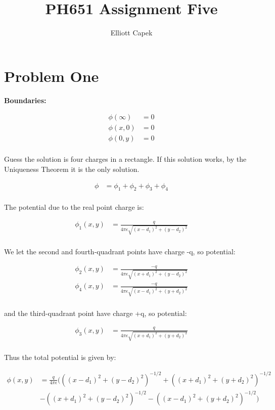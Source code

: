 \documentclass[10pt]{article} %
\title{PH651 Assignment Five}
\author{Elliott Capek}
\begin{document}
\maketitle{}

\section{Problem One}
\textbf{Boundaries:}

\begin{align*}
  \phi(\infty) &= 0\\
  \phi(x,0) &= 0\\
  \phi(0,y) &= 0\\
\end{align*}

Guess the solution is four charges in a rectangle. If this solution works, by the Uniqueness Theorem it is the only solution.

\begin{align*}
  \phi &= \phi_1 + \phi_2 + \phi_3 + \phi_4\\
\end{align*}

The potential due to the real point charge is:

\begin{align*}
  \phi_1(x,y) &= \frac{q}{4\pi\epsilon\sqrt{(x-d_1)^2+(y-d_2)^2}}\\
\end{align*}

We let the second and fourth-quadrant points have charge -q, so potential:

\begin{align*}
  \phi_2(x,y) &= \frac{-q}{4\pi\epsilon\sqrt{(x+d_1)^2+(y-d_2)^2}}\\
  \phi_4(x,y) &= \frac{-q}{4\pi\epsilon\sqrt{(x-d_1)^2+(y+d_2)^2}}\\
\end{align*}

and the third-quadrant point have charge +q, so potential:

\begin{align*}
  \phi_3(x,y) &= \frac{q}{4\pi\epsilon\sqrt{(x+d_1)^2+(y+d_2)^2}}\\
\end{align*}

Thus the total potential is given by:

\begin{align*}
  \phi(x,y) &= \frac{q}{4\pi\epsilon}\Big(
  \left((x-d_1)^2+(y-d_2)^2\right)^{-1/2} + \left((x+d_1)^2+(y+d_2)^2\right)^{-1/2}\\
  &-\left((x+d_1)^2+(y-d_2)^2\right)^{-1/2} - \left((x-d_1)^2+(y+d_2)^2\right)^{-1/2}\Big)
\end{align*}
\end{document}
